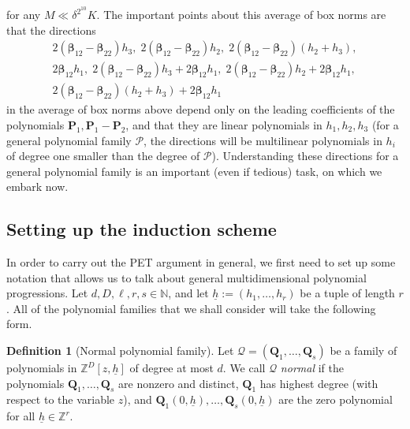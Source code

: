 \documentclass[11pt]{amsart}
\theoremstyle{definition}
\newtheorem{definition}[lemma]{Definition}
\newcommand{\N}{{\mathbb N}}
\newcommand{\Z}{{\mathbb Z}}
\newcommand{\CP}{{\mathcal P}}
\newcommand{\CQ}{{\mathcal Q}}
\newcommand{\bp}{{\textbf{P}}}
\newcommand{\q}{{\textbf{Q}}}
\newcommand{\bbeta}{{\boldsymbol{\beta}}}
\newcommand{\uh}{{\underline{h}}}
\begin{document}
for any $M\ll \delta^{2^{10}} K$. The important points about this average of box norms are that the directions
\begin{gather*}
     2(\bbeta_{12}-\bbeta_{22})h_3 ,\;  2(\bbeta_{12}-\bbeta_{22})h_2 ,\;  2(\bbeta_{12}-\bbeta_{22})(h_2+h_3),\\ 2\bbeta_{12}h_1,\;   2(\bbeta_{12}-\bbeta_{22})h_3 + 2\bbeta_{12}h_1,\;  2(\bbeta_{12}-\bbeta_{22})h_2 + 2\bbeta_{12}h_1,\\  2(\bbeta_{12}-\bbeta_{22})(h_2+h_3) + 2\bbeta_{12}h_1
\end{gather*}
in the average of box norms above depend only on the leading coefficients of the polynomials $\bp_1, \bp_1-\bp_2$, and that they are linear polynomials in $h_1, h_2, h_3$ (for a general polynomial family $\CP$, the directions will be multilinear polynomials in $h_i$ of degree one smaller than the degree  of $\CP$). Understanding these directions for a general polynomial family is an important (even if tedious) task, on which we embark now.


\subsection{Setting up the induction scheme}\label{SS: setting up PET}

In order to carry out the PET argument in general, we first need to set up some notation that allows us to talk about general multidimensional polynomial progressions. Let $d, D, \ell, r, s\in\N$, and let $\uh:=(h_1, \ldots, h_r)$ be a tuple of length $r$. All of the polynomial families that we shall consider will take the following form.
\begin{definition}[Normal polynomial family]
    Let $\CQ = (\q_1, \ldots, \q_{s})$ be a family of polynomials in $\Z^D[z, \uh]$ of degree at most $d$. We call $\CQ$ \textit{normal} if the polynomials $\q_1, \ldots, \q_s$ are nonzero and distinct, $\q_1$ has highest degree (with respect to the variable $z$), and $\q_1(0, \uh), \ldots, \q_s(0,\uh)$ are the zero polynomial for all $\uh\in\Z^r$.
\end{definition}
\end{document}
